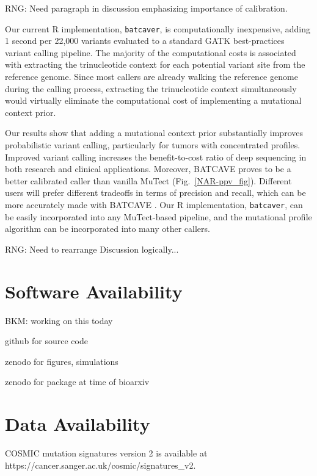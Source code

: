 \documentclass[a4,center,fleqn]{NAR}
\newcommand{\rngcomment}[1]{{\color{red}RNG: #1}}
\newcommand{\bkmcomment}[1]{{\color{blue}BKM: #1}}
\newcommand{\batcave}{BATCAVE }
\begin{document}
\rngcomment{Need paragraph in discussion emphasizing importance of calibration.}




Our current R implementation, \texttt{batcaver}, is computationally inexpensive, adding 1 second per 22,000 variants evaluated to a standard GATK best-practices variant calling pipeline.
The majority of the computational costs is associated with extracting the trinucleotide context for each potential variant site from the reference genome.
Since most callers are already walking the reference genome during the calling process, extracting the trinucleotide context simultaneously would virtually eliminate the computational cost of implementing a mutational context prior.

Our results show that adding a mutational context prior substantially improves probabilistic variant calling, particularly for tumors with concentrated profiles.
Improved variant calling increases the benefit-to-cost ratio of deep sequencing in both research and clinical applications.
Moreover, \batcave proves to be a better calibrated caller than vanilla MuTect (Fig.~\ref{NAR-ppv_fig}).
Different users will prefer different tradeoffs in terms of precision and recall, which can be more accurately made with \batcave.
Our R implementation, \texttt{batcaver}, can be easily incorporated into any MuTect-based pipeline, and the mutational profile algorithm can be incorporated into many other callers.

\rngcomment{Need to rearrange Discussion logically...}


\section{Software Availability}
\bkmcomment{working on this today}

github for source code

zenodo for figures, simulations

zenodo for package at time of bioarxiv

\section{Data Availability}
COSMIC mutation signatures version 2 is available at \footnotesize{https://cancer.sanger.ac.uk/cosmic/signatures\_v2}.
\end{document}
